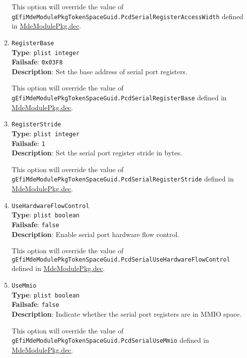 \documentclass[]{article}
\begin{document}
\begin{enumerate}
  This option will override the value of \texttt{gEfiMdeModulePkgTokenSpaceGuid.PcdSerialRegisterAccessWidth}
  defined in \href{https://github.com/acidanthera/audk/blob/master/MdeModulePkg/MdeModulePkg.dec}{MdeModulePkg.dec}.

\item
  \texttt{RegisterBase}\\
  \textbf{Type}: \texttt{plist\ integer}\\
  \textbf{Failsafe}: \texttt{0x03F8}\\
  \textbf{Description}: Set the base address of serial port registers.

  This option will override the value of \texttt{gEfiMdeModulePkgTokenSpaceGuid.PcdSerialRegisterBase}
  defined in \href{https://github.com/acidanthera/audk/blob/master/MdeModulePkg/MdeModulePkg.dec}{MdeModulePkg.dec}.

\item
  \texttt{RegisterStride}\\
  \textbf{Type}: \texttt{plist\ integer}\\
  \textbf{Failsafe}: \texttt{1}\\
  \textbf{Description}: Set the serial port register stride in bytes.

  This option will override the value of \texttt{gEfiMdeModulePkgTokenSpaceGuid.PcdSerialRegisterStride}
  defined in \href{https://github.com/acidanthera/audk/blob/master/MdeModulePkg/MdeModulePkg.dec}{MdeModulePkg.dec}.

\item
  \texttt{UseHardwareFlowControl}\\
  \textbf{Type}: \texttt{plist\ boolean}\\
  \textbf{Failsafe}: \texttt{false}\\
  \textbf{Description}: Enable serial port hardware flow control.

  This option will override the value of \texttt{gEfiMdeModulePkgTokenSpaceGuid.PcdSerialUseHardwareFlowControl}
  defined in \href{https://github.com/acidanthera/audk/blob/master/MdeModulePkg/MdeModulePkg.dec}{MdeModulePkg.dec}.

\item
  \texttt{UseMmio}\\
  \textbf{Type}: \texttt{plist\ boolean}\\
  \textbf{Failsafe}: \texttt{false}\\
  \textbf{Description}: Indicate whether the serial port registers are in MMIO space.

  This option will override the value of \texttt{gEfiMdeModulePkgTokenSpaceGuid.PcdSerialUseMmio}
  defined in \href{https://github.com/acidanthera/audk/blob/master/MdeModulePkg/MdeModulePkg.dec}{MdeModulePkg.dec}.

\end{enumerate}
\end{document}
